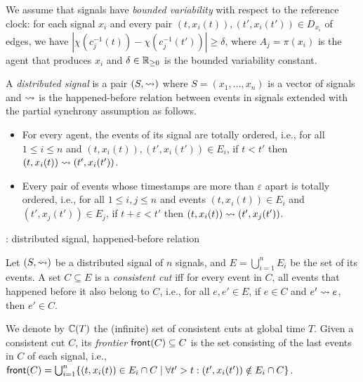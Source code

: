 We assume that signals have \emph{bounded variability} with respect to the reference clock: for each signal $x_i$ and every pair $(t, x_i(t)), (t', x_i(t')) \in D_{x_i}$ of edges, we have $|\chi(c_j^{-1}(t)) - \chi(c_j^{-1}(t'))| \geq \delta$, where $A_j = \pi(x_i)$ is the agent that produces $x_i$ and $\delta \in \mathbb{R}_{\geq 0}$ is the bounded variability constant.

\begin{definition}
	A \emph{distributed signal} is a pair $(S, {\rightsquigarrow})$ where $S = (x_1, \ldots, x_n)$ is a vector of signals and ${\rightsquigarrow}$ is the happened-before relation between events in signals extended with the partial synchrony assumption as follows.
	\begin{itemize}
		\item For every agent, the events of its signal are totally ordered, i.e., for all $1 \leq i \leq n$ and $(t, x_i(t)), (t', x_i(t')) \in E_i$, if $t < t'$ then $(t, x_i(t)) \rightsquigarrow (t', x_i(t'))$.
		\item Every pair of events whose timestamps are more than $\varepsilon$ apart is totally ordered, i.e., for all $1 \leq i,j \leq n$ and events $(t, x_i(t)) \in E_i$ and $(t', x_j(t')) \in E_j$, if $t + \varepsilon < t'$ then $(t, x_i(t)) \rightsquigarrow (t', x_j(t'))$. %
	\end{itemize}
\end{definition}

\begin{example}
	\TODO: distributed signal, happened-before relation
\end{example}

\begin{definition}
	Let $(S, {\rightsquigarrow})$ be a distributed signal of $n$ signals, and $E = \bigcup_{i = 1}^{n} E_i$ be the set of its events.
	A set $C \subseteq E$ is a \emph{consistent cut} iff for every event in $C$, all events that happened before  it also belong to $C$, i.e., for all $e, e' \in E$, if $e \in C$ and $e' \rightsquigarrow e$, then $e' \in C$.
\end{definition}

We denote by $\mathbb{C}(T)$ the (infinite) set of consistent cuts at global time $T$.
Given a consistent cut $C$, its \emph{frontier} $\mathsf{front}(C) \subseteq C$ is the set consisting of the last events in $C$ of each signal, i.e., $\fr(C) = \bigcup_{i = 1}^{n} \{ (t, x_i(t)) \in E_i \cap C \st \forall t' > t : (t', x_i(t')) \notin E_i \cap C \}$.

